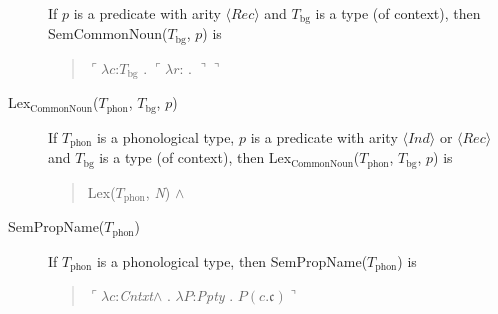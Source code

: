 \begin{description}
If $p$ is a predicate with arity $\langle\textit{Rec}\rangle$ and $T_{\mathrm{bg}}$ is a type (of context), then
    SemCommonNoun($T_{\mathrm{bg}}$, $p$) is
  \begin{quote}
    $\ulcorner\lambda c$:$T_{\mathrm{bg}}$ . $\ulcorner\lambda
r$:
. $\urcorner\urcorner$
\end{quote}
  

\item[\textnormal{Lex$_{\mathrm{CommonNoun}}$($T_{\mathrm{phon}}$,
    $T_{\mathrm{bg}}$, $p$)}] \mbox{}



  If $T_{\mathrm{phon}}$ is a phonological type, $p$ is a
  predicate with arity $\langle\textit{Ind}\rangle$ or $\langle\textit{Rec}\rangle$ and
  $T_{\mathrm{bg}}$ is a type (of context), then
  Lex$_{\mathrm{CommonNoun}}$($T_{\mathrm{phon}}$, $T_{\mathrm{bg}}$,
  $p$) is
  \begin{quote}
    Lex($T_{\mathrm{phon}}$, \textit{N}) \d{$\wedge$}
  \end{quote}
  
\item[\textnormal{SemPropName($T_{\text{phon}}$)}] \mbox{}

  If $T_{\text{phon}}$ is a phonological type, then SemPropName($T_{\text{phon}}$) is
  \begin{quote}
    $\ulcorner\lambda c$:\textit{Cntxt}\d{$\wedge$} . $\lambda
                       P$:\textit{Ppty} . $P(c.\mathfrak{c})\urcorner$
  \end{quote}
  

\end{description}
